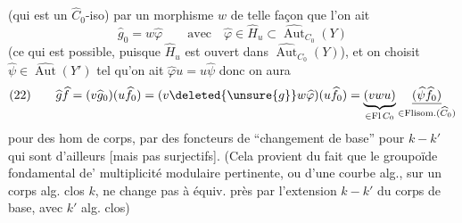 (qui est un $\widehat C_0$-iso) par
un   morphisme  $w$
de telle façon que l'on ait
\[
\widehat g_0=w\widehat\varphi\qquad\text{avec}\quad\widehat\varphi\in\widehat H_u\subset\widehat{\operatorname{Aut}}_{C_0}(Y)
\]
(ce qui est possible, puisque $\widehat H_u$ est ouvert dans $\widehat{\operatorname{Aut}}_{C_0}(Y)$),
et on choisit $\widehat\psi\in\widehat{\operatorname{Aut}}(Y')$ tel qu'on ait $\widehat\varphi u=u\widehat\psi$
donc on aura
\[
(22)\qquad\widehat g\widehat f=(v\widehat g_0)(u\widehat f_0)
=(v\deleted{\unsure{g}}w\widehat\varphi)(u\widehat f_0)
=\underbrace{(vwu)}_{\in\mathrm{Fl}\,C_0}\underset{\in\mathrm{Flisom.}(\widehat C_0)}{\underline{(\widehat\psi\widehat f_0)}}
\]
pour des hom de corps, par des foncteurs
de ``changement de base'' pour $k\mathbin{-}k'$
qui sont d'ailleurs   [mais
pas  surjectifs]. (Cela provient
du fait que le groupoïde fondamental
de'   multiplicité modulaire pertinente,
ou d'une courbe alg., sur un corps alg.
clos $k$, ne change pas à équiv. près
par l'extension $k\mathbin{-}k'$ du corps de base,
avec $k'$ alg. clos) 

